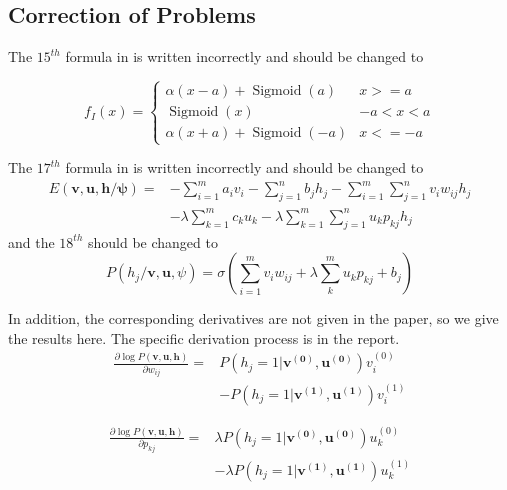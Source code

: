 \documentclass{modified}
\begin{document}
\subsection{Correction of Problems}
The $15^{th}$ formula in \cite{YiThe} is written incorrectly and should be changed to

\begin{equation}
\nonumber
f_{I}(x)=\left\{\begin{array}{ll}{\alpha(x-a)+\operatorname{Sigmoid}(a)} & {x>=a} \\ {\operatorname{Sigmoid}(x)} & {-a<x<a} \\ {\alpha(x+a)+\operatorname{Sigmoid}(-a)} & {x<=-a}\end{array}\right.
\end{equation}

The $17^{th}$ formula in \cite{wang2017improved} is written incorrectly and should be changed to
\begin{equation}
\nonumber
\begin{aligned} E(\boldsymbol{v}, \boldsymbol{u}, \boldsymbol{h} / \boldsymbol{\psi})=&-\sum_{i=1}^{m} a_{i} v_{i}-\sum_{j=1}^{n} b_{j} h_{j}-\sum_{i=1}^{m} \sum_{j=1}^{n} v_{i} w_{i j} h_{j} \\ &-\lambda \sum_{k=1}^{m} c_{k} u_{k}-\lambda \sum_{k=1}^{m} \sum_{j=1}^{n} u_{k} p_{k j} h_{j} \end{aligned}
\end{equation}
and the $18^{th}$ should be changed to
\begin{equation}
\nonumber
P\left(h_{j} / \boldsymbol{v}, \boldsymbol{u}, \psi\right)=\sigma\left(\sum_{i=1}^{m} v_{i} w_{i j}+\lambda \sum_{k}^{m} u_{k}p_{kj}+b_{j}\right)
\end{equation}

In addition, the corresponding derivatives are not given in the paper, so we give the results here. The specific derivation process is in the report.
\begin{equation}
\begin{aligned} 
\frac{\partial \log P(\boldsymbol{v}, \boldsymbol{u}, \boldsymbol{h})}{\partial w_{ij}}=&P(h_j=1|\boldsymbol{v^{(0)}},\boldsymbol{u^{(0)}})v_i^{(0)}\\&-P(h_j=1|\boldsymbol{v^{(1)}},\boldsymbol{u^{(1)}})v_i^{(1)}
\end{aligned}
\end{equation}

\begin{equation}
\begin{aligned} 
\frac{\partial \log P(\boldsymbol{v}, \boldsymbol{u}, \boldsymbol{h})}{\partial p_{kj}}=&\lambda P(h_j=1|\boldsymbol{v^{(0)}},\boldsymbol{u^{(0)}})u_k^{(0)}\\&-\lambda P(h_j=1|\boldsymbol{v^{(1)}},\boldsymbol{u^{(1)}})u_k^{(1)}
\end{aligned}
\end{equation}
\end{document}
